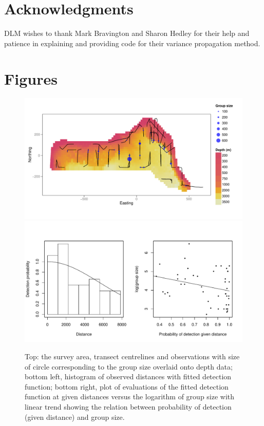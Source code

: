 \documentclass[a4paper,12pt]{article}
\begin{document}
\section*{Acknowledgments}

DLM wishes to thank Mark Bravington and Sharon Hedley for their help and patience in explaining and providing code for their variance propagation method.



\newpage



\newpage


\newpage


\section*{Figures}

\begin{figure}[h!]
  \caption{Top: the survey area, transect centrelines and observations with size of circle corresponding to the group size overlaid onto depth data; bottom left, histogram of observed distances with fitted detection function; bottom right, plot of evaluations of the fitted detection function at given distances versus the logarithm of group size with linear trend showing the relation between probability of detection (given distance) and group size.}
  \label{dolphin-eda}
  \begin{center}
    \includegraphics[width=\textwidth]{figs/depth-transects}\\
        \includegraphics[width=\textwidth]{figs/distances-groups}
  \end{center}
\end{figure}
\end{document}
